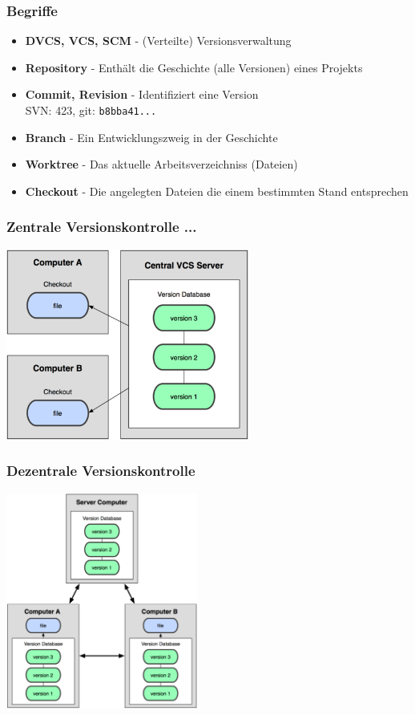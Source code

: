 \begin{frame}
  \frametitle{Begriffe}
  \begin{itemize}
    \item {\bf DVCS, VCS, SCM} - (Verteilte) Versionsverwaltung
    \item {\bf Repository} - Enthält die Geschichte (alle Versionen) eines Projekts
    \item {\bf Commit, Revision} - Identifiziert eine Version \\ SVN: 423, git: {\tt b8bba41...}
    \item {\bf Branch} - Ein Entwicklungszweig in der Geschichte
    \item {\bf Worktree} - Das aktuelle Arbeitsverzeichniss (Dateien)
    \item {\bf Checkout} - Die angelegten Dateien die einem bestimmten Stand entsprechen
  \end{itemize}
\end{frame}

\begin{frame}
  \frametitle{Zentrale Versionskontrolle ...}
  \begin{center}
    \includegraphics[width=8cm]{img/central_vcs.png}
  \end{center}
\end{frame}

\begin{frame}
  \frametitle{Dezentrale Versionskontrolle}
  \begin{center}
    \includegraphics[width=6.3cm]{img/distributed_vcs.png}
  \end{center}
\end{frame}

